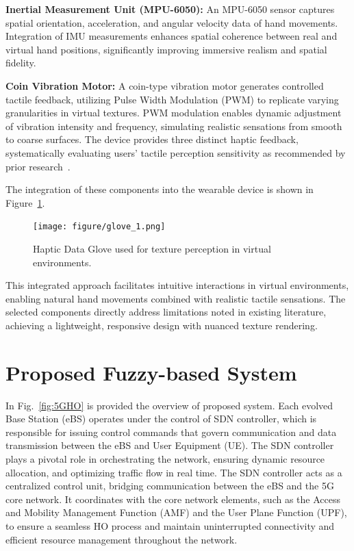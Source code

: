 \documentclass[graybox]{svmult}
\begin{document}
\textbf{Inertial Measurement Unit (MPU-6050):}  
An MPU-6050 sensor captures spatial orientation, acceleration, and angular velocity data of hand movements. Integration of IMU measurements enhances spatial coherence between real and virtual hand positions, significantly improving immersive realism and spatial fidelity.

\textbf{Coin Vibration Motor:}  
A coin-type vibration motor generates controlled tactile feedback, utilizing Pulse Width Modulation (PWM) to replicate varying granularities in virtual textures. PWM modulation enables dynamic adjustment of vibration intensity and frequency, simulating realistic sensations from smooth to coarse surfaces. The device provides three distinct haptic feedback, systematically evaluating users' tactile perception sensitivity as recommended by prior research~\cite{strohmeier2017generating, bensmaia2005vibrations}.

The integration of these components into the wearable device is shown in Figure~\ref{fig:glove_1}.

\begin{figure}\centering
	\texttt{[image: figure/glove\_1.png]}%
	\caption{Haptic Data Glove used for texture perception in virtual environments.}\label{fig:glove_1}
\end{figure}

This integrated approach facilitates intuitive interactions in virtual environments, enabling natural hand movements combined with realistic tactile sensations. The selected components directly address limitations noted in existing literature, achieving a lightweight, responsive design with nuanced texture rendering.


\section{Proposed Fuzzy-based System}\label{sec:proposed}

In Fig.~\ref{fig:5GHO} is provided the overview of proposed system. Each evolved Base Station (eBS) operates under the control of SDN controller, which is responsible for issuing control commands that govern communication and data transmission between the eBS and User Equipment (UE). The SDN controller plays a pivotal role in orchestrating the network, ensuring dynamic resource allocation, and optimizing traffic flow in real time. The SDN controller acts as a centralized control unit, bridging communication between the eBS and the 5G core network. It coordinates with the core network elements, such as the Access and Mobility Management Function (AMF) and the User Plane Function (UPF), to ensure a seamless HO process and maintain uninterrupted connectivity and efficient resource management throughout the network.
\end{document}
